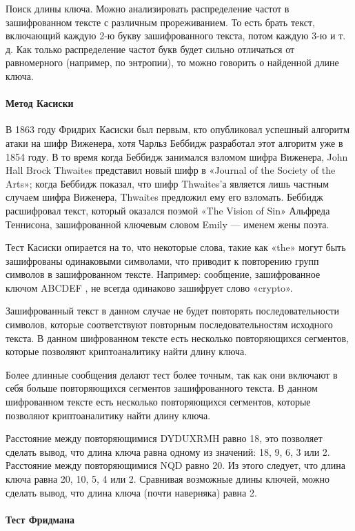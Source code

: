 Поиск длины ключа. Можно анализировать распределение частот в 
зашифрованном тексте с различным прореживанием. То есть брать 
текст, включающий каждую 2-ю букву зашифрованного текста, потом 
каждую 3-ю и т. д. Как только распределение частот букв будет 
сильно отличаться от равномерного (например, по энтропии), то 
можно говорить о найденной длине ключа.

\paragraph{Метод Касиски}

В 1863 году Фридрих Касиски был первым, кто опубликовал успешный 
алгоритм атаки на шифр Виженера, хотя Чарльз Беббидж разработал 
этот алгоритм уже в 1854 году. В то время когда Беббидж занимался 
взломом шифра Виженера, John Hall Brock Thwaites представил новый 
шифр в «Journal of the Society of the Arts»; когда Беббидж показал,
что шифр Thwaites’а является лишь частным случаем шифра Виженера,
Thwaites предложил ему его взломать. Беббидж расшифровал текст,
который оказался поэмой «The Vision of Sin» Альфреда Теннисона,
зашифрованной ключевым словом Emily — именем жены поэта.

Тест Касиски опирается на то, что некоторые слова, такие как 
«the» могут быть зашифрованы одинаковыми символами, что приводит 
к повторению групп символов в зашифрованном тексте. Например: 
сообщение, зашифрованное ключом ABCDEF , не всегда одинаково 
зашифрует слово «crypto».

Зашифрованный текст в данном случае не будет повторять последовательности 
символов, которые соответствуют повторным последовательностям 
исходного текста. В данном шифрованном тексте есть несколько 
повторяющихся сегментов, которые позволяют криптоаналитику найти 
длину ключа.

Более длинные сообщения делают тест более точным, так как они 
включают в себя больше повторяющихся сегментов зашифрованного 
текста. В данном шифрованном тексте есть несколько повторяющихся 
сегментов, которые позволяют криптоаналитику найти длину ключа.

Расстояние между повторяющимися DYDUXRMH равно 18, это позволяет 
сделать вывод, что длина ключа равна одному из значений: 
18, 9, 6, 3 или 2. Расстояние между повторяющимися NQD равно 20. Из 
этого следует, что длина ключа равна 20, 10, 5, 4 
или 2. Сравнивая возможные длины ключей, можно сделать вывод, 
что длина ключа (почти наверняка) равна 2.

\paragraph{Тест Фридмана}

